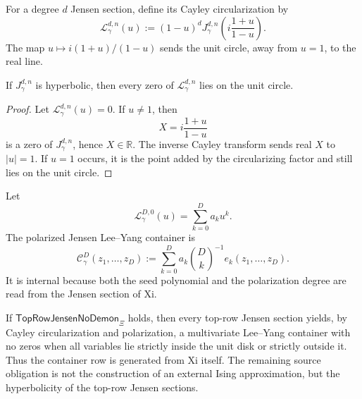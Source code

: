 \begin{definition}
\label{def:rh-cayley-circularized-jensen-section}
For a degree $d$ Jensen section, define its Cayley circularization by
$$
\mathcal L_{\gamma}^{d,n}(u)
:=
(1-u)^d
J_{\gamma}^{d,n}
\left(
i\frac{1+u}{1-u}
\right).
$$
The map $u\mapsto i(1+u)/(1-u)$ sends the unit circle, away from
$u=1$, to the real line.
\end{definition}

\begin{theorem}
\label{thm:rh-hyperbolic-jensen-gives-lee-yang-circle}
If $J_{\gamma}^{d,n}$ is hyperbolic, then every zero of
$\mathcal L_{\gamma}^{d,n}$ lies on the unit circle.
\end{theorem}

\begin{proof}
Let $\mathcal L_{\gamma}^{d,n}(u)=0$.  If $u\ne1$, then
$$
X=i\frac{1+u}{1-u}
$$
is a zero of $J_{\gamma}^{d,n}$, hence $X\in\mathbb R$.  The inverse
Cayley transform sends real $X$ to $|u|=1$.  If $u=1$ occurs, it is the
point added by the circularizing factor and still lies on the unit
circle.
\end{proof}

\begin{definition}
\label{def:rh-polarized-jensen-lee-yang-container}
Let
$$
\mathcal L_{\gamma}^{D,0}(u)=\sum_{k=0}^{D}a_k u^k.
$$
The polarized Jensen Lee--Yang container is
$$
\mathcal C_{\gamma}^{D}
(z_1,\ldots,z_D)
:=
\sum_{k=0}^{D}
a_k\binom{D}{k}^{-1}
e_k(z_1,\ldots,z_D).
$$
It is internal because both the seed polynomial and the polarization
degree are read from the Jensen section of Xi.
\end{definition}

\begin{principle}
\label{prin:rh-jensen-containers-internal-no-scale}
If $\mathsf{TopRowJensenNoDemon}_{\Xi}$ holds, then every top-row
Jensen section yields, by Cayley circularization and polarization, a
multivariate Lee--Yang container with no zeros when all variables lie
strictly inside the unit disk or strictly outside it.  Thus the
container row is generated from Xi itself.  The remaining source
obligation is not the construction of an external Ising approximation,
but the hyperbolicity of the top-row Jensen sections.
\end{principle}

